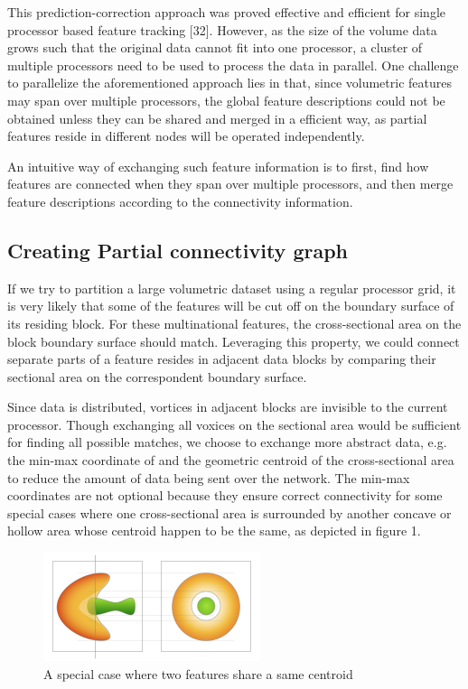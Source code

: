 \documentclass[10pt, conference, compsocconf]{IEEEtran}
\begin{document}
This prediction-correction approach was proved effective and efficient for single processor based feature tracking [32]. However, as the size of the volume data grows such that the original data cannot fit into one processor, a cluster of multiple processors need to be used to process the data in parallel. One challenge to parallelize the aforementioned approach lies in that, since volumetric features may span over multiple processors, the global feature descriptions could not be obtained unless they can be shared and merged in a efficient way, as partial features reside in different nodes will be operated independently. 

An intuitive way of exchanging such feature information is to first, find how features are connected when they span over multiple processors, and then merge feature descriptions according to the connectivity information.

\subsection{Creating Partial connectivity graph}
If we try to partition a large volumetric dataset using a regular processor grid, it is very likely that some of the features will be cut off on the boundary surface of its residing block. For these multinational features, the cross-sectional area on the block boundary surface should match. Leveraging this property, we could connect separate parts of a feature resides in adjacent data blocks by comparing their sectional area on the correspondent boundary surface. 

Since data is distributed, vortices in adjacent blocks are invisible to the current processor. Though exchanging all voxices on the sectional area would be sufficient for finding all possible matches, we choose to exchange more abstract data, e.g. the min-max coordinate of and the geometric centroid of the cross-sectional area to reduce the amount of data being sent over the network. The min-max coordinates are not optional because they ensure correct connectivity for some special cases where one cross-sectional area is surrounded by another concave or hollow area whose centroid happen to be the same, as depicted in figure 1.

\begin{figure}[htpb]
\centering
\includegraphics[width=2.5in]{figure1@2x.png}
\caption{A special case where two features share a same centroid}
\end{figure}
\end{document}
